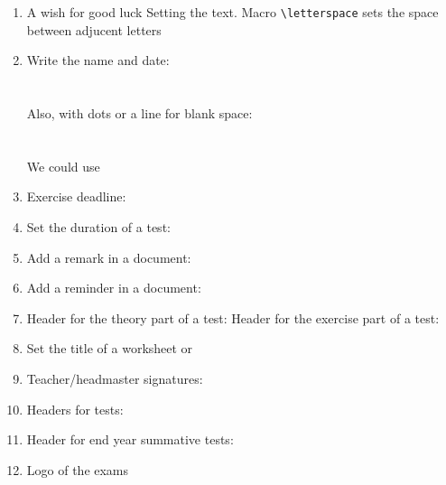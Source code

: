 \documentclass[12pt,a4page]{article}
\begin{document}
\begin{enumerate}
\item A wish for good luck
  \wish
  Setting the text. Macro \verb/\letterspace/ sets the space between adjucent letters
  \makeatletter
  \def\schl@wish{\letterspace{10} ΚΑΛΗ ΤΥΧΗ}
  \makeatother
  \wish
\item Write the name and date:\\
  \fullname{}\\
  \datefield{} \\[1ex]
  Also, with dots or a line for blank space:\\
  \\ \datefield{\blankspace{10em}}\\[1ex]
  We could use \\
  \datefield{\getdate}
\item Exercise deadline: \hspace{3em} \\
\item Set the duration of a test:\\ 
\item Add a remark in a document:\\ 
\item Add a reminder in a document:\\ 
\item Header for the theory part of a test: \theorypart
  Header for the exercise part of a test: \exercisepart
\item Set the title of a worksheet
  \worksheethd{}
  or
\item Teacher/headmaster signatures:\\
  \hfill
\item Headers for tests:
  \examhd{}
\item Header for end year summative tests:
\item Logo of the  exams


\end{enumerate}
\end{document}
